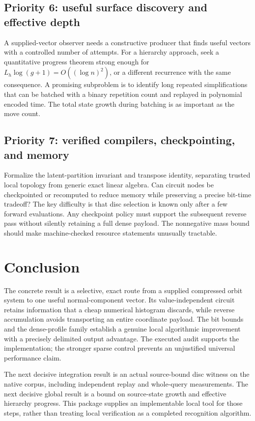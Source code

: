 \documentclass[11pt]{article}
\theoremstyle{definition}\newtheorem{definition}[theorem]{Definition}
\theoremstyle{remark}\newtheorem{remark}[theorem]{Remark}
\begin{document}
\subsection{Priority 6: useful surface discovery and effective depth}
A supplied-vector observer needs a constructive producer that finds useful
vectors with a controlled number of attempts. For a hierarchy approach, seek a
quantitative progress theorem strong enough for
$L_h\log(g+1)=O((\log n)^2)$, or a different recurrence with the same consequence.
A promising subproblem is to identify long repeated simplifications that can be
batched with a binary repetition count and replayed in polynomial encoded time.
The total state growth during batching is as important as the move count.

\subsection{Priority 7: verified compilers, checkpointing, and memory}
Formalize the latent-partition invariant and transpose identity, separating
trusted local topology from generic exact linear algebra. Can circuit nodes be
checkpointed or recomputed to reduce memory while preserving a precise bit-time
tradeoff? The key difficulty is that disc selection is known only after a few
forward evaluations. Any checkpoint policy must support the subsequent reverse
pass without silently retaining a full dense payload. The nonnegative mass
bound should make machine-checked resource statements unusually tractable.

\section{Conclusion}
The concrete result is a selective, exact route from a supplied compressed orbit
system to one useful normal-component vector. Its value-independent circuit
retains information that a cheap numerical histogram discards, while reverse
accumulation avoids transporting an entire coordinate payload. The bit bounds
and the dense-profile family establish a genuine local algorithmic improvement
with a precisely delimited output advantage. The executed audit supports the
implementation; the stronger sparse control prevents an unjustified universal
performance claim.

The next decisive integration result is an actual source-bound disc witness on
the native corpus, including independent replay and whole-query measurements.
The next decisive global result is a bound on source-state growth and effective
hierarchy progress. This package supplies an implementable local tool for those
steps, rather than treating local verification as a completed recognition
algorithm.
\end{document}
